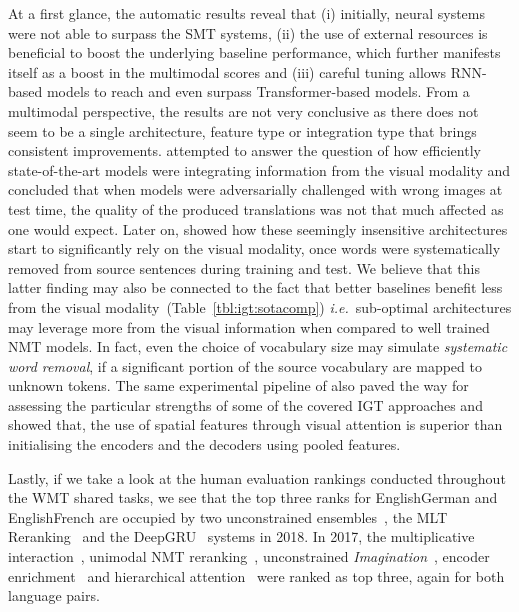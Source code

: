 \documentclass{svjour3}
\newcommand{\ie}[1]{\textit{i.e.}~#1}
\newcommand{\lp}[2]{#1#2}
\begin{document}
At a first glance, the automatic results reveal that (i) initially, neural systems were not able to surpass the SMT systems, (ii) the use of external resources is beneficial to boost the underlying baseline performance, which further manifests itself as a boost in the multimodal scores and (iii) careful tuning allows RNN-based models to reach and even surpass Transformer-based models.
From a multimodal perspective, the results are not very conclusive as there does not seem to be a single architecture, feature type or integration type that brings consistent improvements.
\cite{elliott2018adversarial} attempted to answer the question of how efficiently state-of-the-art models were integrating information from the visual modality and concluded that when models were adversarially challenged with wrong images at test time, the quality of the produced translations was not that much affected as one would expect. Later on, \cite{caglayan-probing-2019} showed how these seemingly insensitive architectures start to significantly rely on the visual modality, once words were systematically removed from source sentences during training and test. We believe that this latter finding may also be connected to the fact that better baselines benefit less from the visual modality~(Table~\ref{tbl:igt:sotacomp}) \ie sub-optimal architectures may leverage more from the visual information when compared to well trained NMT models. In fact, even the choice of vocabulary size may simulate \textit{systematic word removal}, if a significant portion of the source vocabulary are mapped to unknown tokens.
The same experimental pipeline of \cite{caglayan-probing-2019} also paved the way for assessing the particular strengths of some of the covered IGT approaches and showed that, the use of spatial features through visual attention is superior than initialising the encoders and the decoders using pooled features.

Lastly, if we take a look at the human evaluation rankings conducted throughout the WMT shared tasks, we see that the top three ranks for \lp{English}{German} and \lp{English}{French} are occupied by two unconstrained ensembles~\citep{gronroos-memad-2018,helcl-libovick-varis:2018:WMT}, the MLT Reranking~\citep{lala-EtAl:2018:WMT} and the DeepGRU~\citep{delbrouck-dupont:2018:WMT} systems in 2018. In 2017, the multiplicative interaction~\citep{caglayan-lium-cvc-2017}, unimodal NMT reranking~\citep{zhang-EtAl:2017:WMT2}, unconstrained \textit{Imagination}~\citep{elliott-imagination-2017}, encoder enrichment~\citep{calixto-incorporating-2017} and hierarchical attention~\citep{helcl-libovicky:2017:WMT} were ranked as top three, again for both language pairs.
\end{document}
